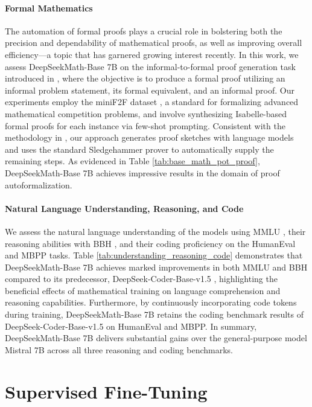 \begin{itemize}[topsep=0pt]
\paragraph{Formal Mathematics}

The automation of formal proofs plays a crucial role in bolstering both the precision and dependability of mathematical proofs, as well as improving overall efficiency—a topic that has garnered growing interest recently. In this work, we assess DeepSeekMath-Base 7B on the informal-to-formal proof generation task introduced in \citep{dsp_proof}, where the objective is to produce a formal proof utilizing an informal problem statement, its formal equivalent, and an informal proof. Our experiments employ the miniF2F dataset \citep{minif2f}, a standard for formalizing advanced mathematical competition problems, and involve synthesizing Isabelle-based formal proofs for each instance via few-shot prompting. Consistent with the methodology in \cite{dsp_proof}, our approach generates proof sketches with language models and uses the standard Sledgehammer prover \citep{sledgehammer} to automatically supply the remaining steps. As evidenced in Table \ref{tab:base_math_pot_proof}, DeepSeekMath-Base 7B achieves impressive results in the domain of proof autoformalization.

\paragraph{Natural Language Understanding, Reasoning, and Code}

We assess the natural language understanding of the models using MMLU \citep{mmlu}, their reasoning abilities with BBH \citep{bbh}, and their coding proficiency on the HumanEval \citep{codex} and MBPP \citep{mbpp} tasks. Table \ref{tab:understanding_reasoning_code} demonstrates that DeepSeekMath-Base 7B achieves marked improvements in both MMLU and BBH compared to its predecessor, DeepSeek-Coder-Base-v1.5 \citep{deepseek-coder}, highlighting the beneficial effects of mathematical training on language comprehension and reasoning capabilities. Furthermore, by continuously incorporating code tokens during training, DeepSeekMath-Base 7B retains the coding benchmark results of DeepSeek-Coder-Base-v1.5 on HumanEval and MBPP. In summary, DeepSeekMath-Base 7B delivers substantial gains over the general-purpose model Mistral 7B \citep{mistral} across all three reasoning and coding benchmarks.

\section{Supervised Fine-Tuning}


\end{itemize}
